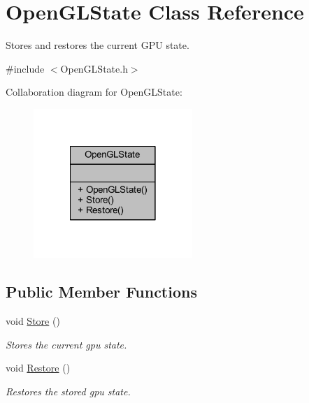 \hypertarget{class_open_g_l_state}{\section{Open\-G\-L\-State Class Reference}
\label{class_open_g_l_state}
}


Stores and restores the current G\-P\-U state.  




{\ttfamily \#include $<$Open\-G\-L\-State.\-h$>$}



Collaboration diagram for Open\-G\-L\-State\-:\nopagebreak
\begin{figure}[H]
\begin{center}
\leavevmode
\includegraphics[width=170pt]{class_open_g_l_state__coll__graph}
\end{center}
\end{figure}
\subsection*{Public Member Functions}
\begin{DoxyCompactItemize}
\item 
\hypertarget{class_open_g_l_state_a8078b65f6b29b681960ba03b6d35160e}{void \hyperlink{class_open_g_l_state_a8078b65f6b29b681960ba03b6d35160e}{Store} ()}\label{class_open_g_l_state_a8078b65f6b29b681960ba03b6d35160e}

\begin{DoxyCompactList}\small\item\em Stores the current gpu state. \end{DoxyCompactList}\item 
\hypertarget{class_open_g_l_state_a08189bfef75f3408539b1e570d14d838}{void \hyperlink{class_open_g_l_state_a08189bfef75f3408539b1e570d14d838}{Restore} ()}\label{class_open_g_l_state_a08189bfef75f3408539b1e570d14d838}

\begin{DoxyCompactList}\small\item\em Restores the stored gpu state. \end{DoxyCompactList}\end{DoxyCompactItemize}


